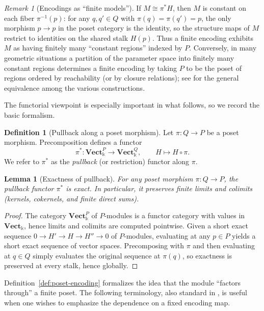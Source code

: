 \documentclass{article}
\newcommand{\kk}{\Bbbk}
\newcommand{\<}{\langle}
\renewcommand{\>}{\rangle}
\newtheorem{lemma}[theorem]{Lemma}
\theoremstyle{definition}
\newtheorem{defn}[theorem]{Definition}
\theoremstyle{remark}
\newtheorem*{remark}{Remark}
\begin{document}
	\begin{remark}[Encodings as ``finite models'']
		\label{rem:encoding-fibers}
		If $M\cong \pi^*H$, then $M$ is constant on each fiber $\pi^{-1}(p)$: for any
		$q,q'\in Q$ with $\pi(q)=\pi(q')=p$, the only morphism $p\to p$ in the poset category
		is the identity, so the structure maps of $M$ restrict to identities on the shared stalk
		$H(p)$.  Thus a finite encoding exhibits $M$ as having finitely many ``constant
		regions'' indexed by $P$.
		Conversely, in many geometric situations a partition of the parameter space into finitely
		many constant regions determines a finite encoding by taking $P$ to be the poset of
		regions ordered by reachability (or by closure relations); see \cite{Mil20} for the
		general equivalence among the various constructions.
	\end{remark}
	
	The functorial viewpoint is especially important in what follows, so we record the basic
	formalism.
	
	\begin{defn}[Pullback along a poset morphism]
		\label{def:pullback}
		Let $\pi\colon Q\to P$ be a poset morphism.  Precomposition defines a functor
		\[
		\pi^* \colon \mathbf{Vect}_{\kk}^{P} \longrightarrow \mathbf{Vect}_{\kk}^{Q},
		\qquad
		H \longmapsto H\circ \pi.
		\]
		We refer to $\pi^*$ as the \emph{pullback} (or restriction) functor along $\pi$.
	\end{defn}
	
	\begin{lemma}[Exactness of pullback]
		\label{lem:pullback-exact}
		For any poset morphism $\pi\colon Q\to P$, the pullback functor $\pi^*$ is exact.
		In particular, it preserves finite limits and colimits (kernels, cokernels, and finite
		direct sums).
	\end{lemma}
	
	\begin{proof}
		The category $\mathbf{Vect}_{\kk}^{P}$ of $P$-modules is a functor category with values
		in $\mathbf{Vect}_{\kk}$, hence limits and colimits are computed pointwise.
		Given a short exact sequence $0\to H'\to H\to H''\to 0$ of $P$-modules, evaluating at
		any $p\in P$ yields a short exact sequence of vector spaces.  Precomposing with $\pi$
		and then evaluating at $q\in Q$ simply evaluates the original sequence at $\pi(q)$, so
		exactness is preserved at every stalk, hence globally.
	\end{proof}
	
	Definition~\ref{def:poset-encoding} formalizes the idea that the module ``factors
	through'' a finite poset.  The following terminology, also standard in \cite{Mil20}, is
	useful when one wishes to emphasize the dependence on a fixed encoding map.
	
\end{document}
